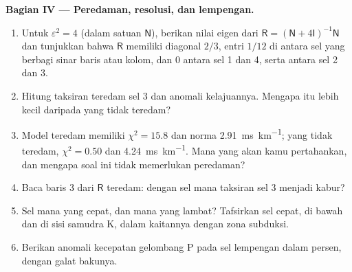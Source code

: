 \begin{problem}
\noindent\textbf{Bagian IV --- Peredaman, resolusi, dan lempengan.}
\begin{enumerate}[resume]
  \item Untuk $\varepsilon^2 = 4$ (dalam satuan $\mathsf N$), berikan
        nilai eigen dari $\mathsf R = (\mathsf N + 4\mathsf I)^{-1}\mathsf N$ dan
        tunjukkan bahwa $\mathsf R$ memiliki diagonal $2/3$, entri $1/12$
        di antara sel yang berbagi sinar baris atau kolom, dan $0$ antara sel 1
        dan 4, serta antara sel 2 dan 3.
  \item Hitung taksiran teredam sel 3 dan anomali kelajuannya. Mengapa itu
        lebih kecil daripada yang tidak teredam?
  \item Model teredam memiliki $\chi^2 = 15.8$ dan norma \qty{2.91}{ms.km^{-1}};
        yang tidak teredam, $\chi^2 = 0.50$ dan \qty{4.24}{ms.km^{-1}}. Mana yang akan
        kamu pertahankan, dan mengapa soal ini tidak memerlukan peredaman?
  \item Baca baris 3 dari $\mathsf R$ teredam: dengan sel mana taksiran
        sel 3 menjadi kabur?
  \item Sel mana yang cepat, dan mana yang lambat? Tafsirkan sel cepat, di bawah dan
        di sisi samudra K, dalam kaitannya dengan zona subduksi.
  \item Berikan anomali kecepatan gelombang P pada sel lempengan dalam persen, dengan
        galat bakunya.
\end{enumerate}
\end{problem}
